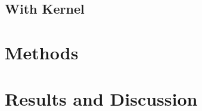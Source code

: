 \documentclass[
10pt, %
a4paper, %
oneside, %
headinclude,footinclude, %
BCOR5mm, %
]{scrartcl}
\begin{document}
\subsection{With Kernel}

\section{Methods}



\section{Results and Discussion}


\renewcommand{\refname}{\spacedlowsmallcaps{References}} %




\end{document}
